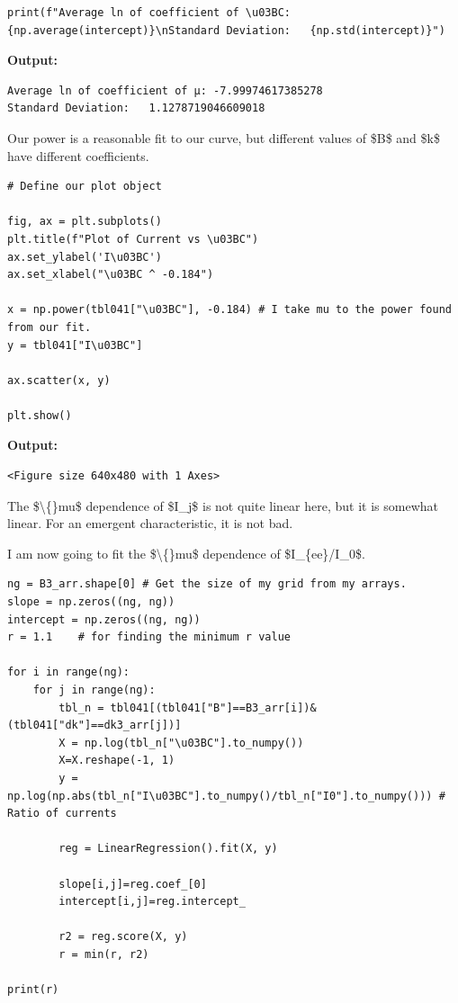 \documentclass{article}
\begin{document}
\begin{lstlisting}
print(f"Average ln of coefficient of \u03BC: {np.average(intercept)}\nStandard Deviation:   {np.std(intercept)}")\end{lstlisting}

\textbf{Output:}\begin{verbatim}
Average ln of coefficient of μ: -7.99974617385278
Standard Deviation:   1.1278719046609018

\end{verbatim}

Our power is a reasonable fit to our curve, but different values of \$B\$ and \$k\$ have different coefficients. 

\begin{lstlisting}
# Define our plot object

fig, ax = plt.subplots()
plt.title(f"Plot of Current vs \u03BC")
ax.set_ylabel('I\u03BC')
ax.set_xlabel("\u03BC ^ -0.184")

x = np.power(tbl041["\u03BC"], -0.184) # I take mu to the power found from our fit.
y = tbl041["I\u03BC"]

ax.scatter(x, y)

plt.show()\end{lstlisting}

\textbf{Output:}\begin{verbatim}
<Figure size 640x480 with 1 Axes>
\end{verbatim}

The \$\textbackslash\{\}mu\$ dependence of \$I\_j\$ is not quite linear here, but it is somewhat linear. For an emergent characteristic, it is not bad.

I am now going to fit the \$\textbackslash\{\}mu\$ dependence of \$I\_\{ee\}/I\_0\$. 

\begin{lstlisting}
ng = B3_arr.shape[0] # Get the size of my grid from my arrays.
slope = np.zeros((ng, ng))
intercept = np.zeros((ng, ng))
r = 1.1    # for finding the minimum r value

for i in range(ng):
    for j in range(ng):
        tbl_n = tbl041[(tbl041["B"]==B3_arr[i])&(tbl041["dk"]==dk3_arr[j])]
        X = np.log(tbl_n["\u03BC"].to_numpy())
        X=X.reshape(-1, 1)
        y = np.log(np.abs(tbl_n["I\u03BC"].to_numpy()/tbl_n["I0"].to_numpy())) # Ratio of currents

        reg = LinearRegression().fit(X, y)

        slope[i,j]=reg.coef_[0]
        intercept[i,j]=reg.intercept_

        r2 = reg.score(X, y)
        r = min(r, r2)

print(r)\end{lstlisting}
\end{document}

